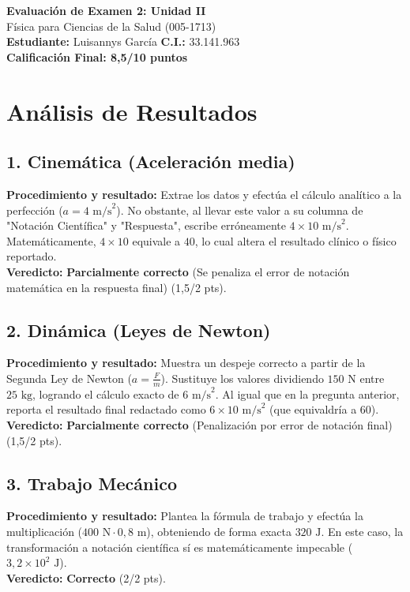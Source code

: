 \documentclass[12pt,letterpaper]{article}
\begin{document}
\begin{center}
    \Large \textbf{Evaluación de Examen 2: Unidad II} \\
    \large Física para Ciencias de la Salud (005-1713) \\
    \vspace{0.5cm}
    \textbf{Estudiante:} Luisannys García \quad \textbf{C.I.:} 33.141.963
    \vspace{0.3cm} \\
    \large \textbf{Calificación Final: 8,5/10 puntos}
\end{center}

\vspace{0.5cm}

\section*{Análisis de Resultados}

\subsection*{1. Cinemática (Aceleración media)}
\textbf{Procedimiento y resultado:} Extrae los datos y efectúa el cálculo analítico a la perfección ($a = 4 \text{ m/s}^2$). No obstante, al llevar este valor a su columna de "Notación Científica" y "Respuesta", escribe erróneamente $4 \times 10 \text{ m/s}^2$. Matemáticamente, $4 \times 10$ equivale a $40$, lo cual altera el resultado clínico o físico reportado. \\
\textbf{Veredicto:} \textbf{Parcialmente correcto} (Se penaliza el error de notación matemática en la respuesta final) (1,5/2 pts).

\subsection*{2. Dinámica (Leyes de Newton)}
\textbf{Procedimiento y resultado:} Muestra un despeje correcto a partir de la Segunda Ley de Newton ($a = \frac{F}{m}$). Sustituye los valores dividiendo $150 \text{ N}$ entre $25 \text{ kg}$, logrando el cálculo exacto de $6 \text{ m/s}^2$. Al igual que en la pregunta anterior, reporta el resultado final redactado como $6 \times 10 \text{ m/s}^2$ (que equivaldría a 60). \\
\textbf{Veredicto:} \textbf{Parcialmente correcto} (Penalización por error de notación final) (1,5/2 pts).

\subsection*{3. Trabajo Mecánico}
\textbf{Procedimiento y resultado:} Plantea la fórmula de trabajo y efectúa la multiplicación ($400 \text{ N} \cdot 0,8 \text{ m}$), obteniendo de forma exacta $320 \text{ J}$. En este caso, la transformación a notación científica sí es matemáticamente impecable ($3,2 \times 10^2 \text{ J}$). \\
\textbf{Veredicto:} \textbf{Correcto} (2/2 pts).
\end{document}
